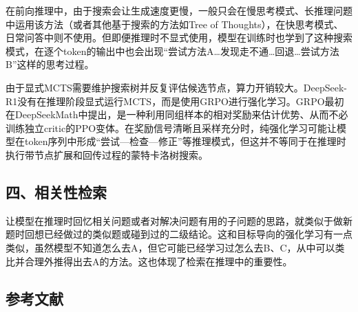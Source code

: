 在前向推理中，由于搜索会让生成速度更慢，一般只会在慢思考模式、长推理问题中运用该方法（或者其他基于搜索的方法如Tree of Thoughts），在快思考模式、日常问答中则不使用。但即便推理时不显式使用，模型在训练时也学到了这种搜索模式，在逐个token的输出中也会出现``尝试方法A\ldots 发现走不通\ldots 回退\ldots 尝试方法B''这样的思考过程。

由于显式MCTS需要维护搜索树并反复评估候选节点，算力开销较大。DeepSeek-R1没有在推理阶段显式运行MCTS，而是使用GRPO进行强化学习。GRPO最初在DeepSeekMath中提出，是一种利用同组样本的相对奖励来估计优势、从而不必训练独立critic的PPO变体。在奖励信号清晰且采样充分时，纯强化学习可能让模型在token序列中形成``尝试---检查---修正''等推理模式，但这并不等同于在推理时执行带节点扩展和回传过程的蒙特卡洛树搜索。

\hypertarget{ux56dbux76f8ux5173ux6027ux68c0ux7d22}{%
\subsection{四、相关性检索}\label{ux56dbux76f8ux5173ux6027ux68c0ux7d22}}

让模型在推理时回忆相关问题或者对解决问题有用的子问题的思路，就类似于做新题时回想已经做过的类似题或碰到过的二级结论。这和目标导向的强化学习有一点类似，虽然模型不知道怎么去A，但它可能已经学习过怎么去B、C，从中可以类比并合理外推得出去A的方法。这也体现了检索在推理中的重要性。

\FloatBarrier
{}
\hypertarget{ux53c2ux8003ux6587ux732e-120}{%
\subsection{参考文献}\label{ux53c2ux8003ux6587ux732e-120}}

